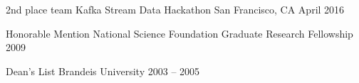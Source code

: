 



\begin{cvhonors}

  \cvhonor
    {2nd place team} %
    {Kafka Stream Data Hackathon} %
    {San Francisco, CA} %
    {April 2016} %

  \cvhonor
    {Honorable Mention} %
    {National Science Foundation Graduate Research Fellowship} %
    {} %
    {2009} %

  \cvhonor
    {Dean's List} %
    {Brandeis University} %
    {} %
    {2003 -- 2005} %

\end{cvhonors}







